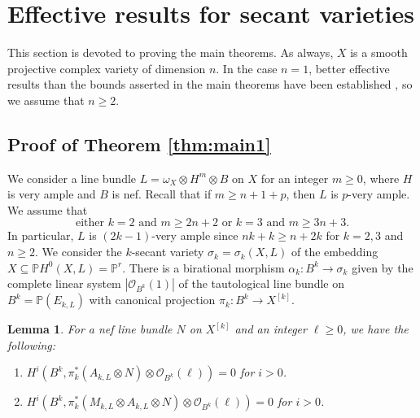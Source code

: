 \documentclass{amsart}
\theoremstyle{plain}
\newtheorem{lem}[thm]{Lemma}
\theoremstyle{definition}
\theoremstyle{remark}
\begin{document}
\section{Effective results for secant varieties}\label{sec:proofs}
\noindent This section is devoted to proving the main theorems. As always, $X$ is a smooth projective complex variety of dimension $n$. In the case $n=1$, better effective results than the bounds asserted in the main theorems have been established \cite{Agostini.Park.25, Ein.Niu.Park.20}, so we assume that $n \geq 2$.

\subsection{Proof of Theorem \ref{thm:main1}} 
We consider a line bundle $L = \omega_X \otimes H^m \otimes B$ on $X$ for an integer $m \geq 0$, where $H$ is very ample and $B$ is nef. Recall that if $m \geq n+1+p$, then $L$ is $p$-very ample. We assume that 
$$
\text{either $k=2$ and $m \geq 2n+2$ or $k=3$ and $m \geq 3n+3$}.
$$
In particular, $L$ is $(2k-1)$-very ample since $nk+k \geq n+2k$ for $k=2,3$ and $n \geq 2$. We consider the $k$-secant variety $\sigma_k=\sigma_k(X, L)$ of the embedding $X \subseteq \mathbb{P} H^0(X, L) = \mathbb{P}^r$. There is a birational morphism $\alpha_k \colon B^k \to \sigma_k$ given by the complete linear system $|\mathcal{O}_{B^{k}}(1)|$ of the tautological line bundle on $B^k = \mathbb{P}(E_{k,L})$ with canonical projection $\pi_k \colon B^k \to X^{[k]}$. 


\begin{lem}\label{lem:maintechnical1}
For a nef line bundle $N$ on $X^{[k]}$ and an integer $\ell \geq 0$, we have the following:
\begin{enumerate}
    \item $H^i(B^k,  \pi_k^* (A_{k,L} \otimes N) \otimes \mathcal{O}_{B^k}(\ell))=0$ for $i>0$. 
    \item $H^i(B^k, \pi_k^* (M_{k,L} \otimes A_{k,L} \otimes N) \otimes \mathcal{O}_{B^k}(\ell))=0$ for $i>0$.
\end{enumerate}
\end{lem}
\end{document}
